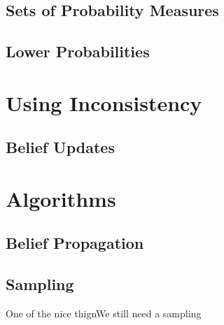 \documentclass{article}
\begin{document}
	

	\subsection{Sets of Probability Measures}


	
	\subsection{Lower Probabilities}



	\section{Using Inconsistency}	
	\subsection{Belief Updates} \label{sec:belief-update}
	

	\section{Algorithms}\label{sec:algorithms}
	\subsection{Belief Propagation}
	\subsection{Sampling}
	
	One of the nice thignWe still need a sampling 
\end{document}
